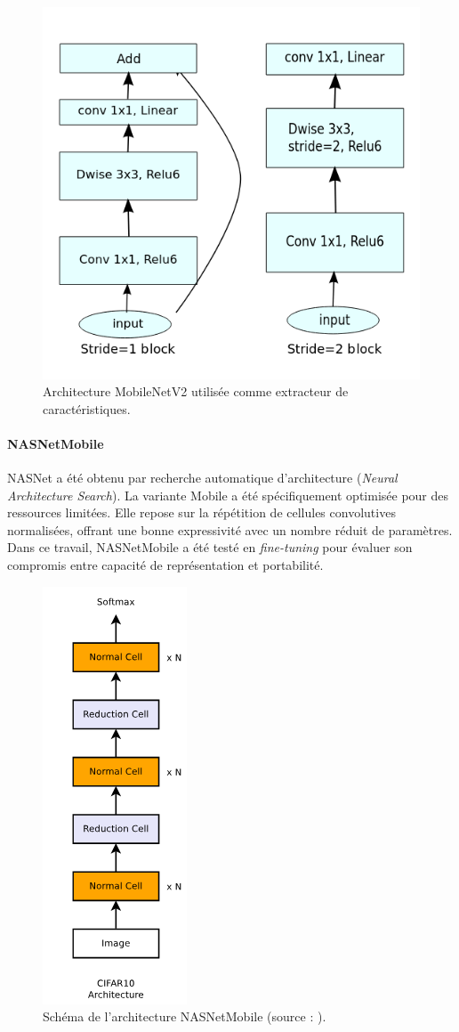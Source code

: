 \begin{figure}[H]
    \centering
    \includegraphics[width=0.65\linewidth]{figures/mobilenetv2.png}
    \caption{Architecture MobileNetV2 utilisée comme extracteur de caractéristiques.}
    \label{fig:mobilenetv2}
\end{figure}

\paragraph{NASNetMobile}
NASNet \cite{zoph2018} a été obtenu par recherche automatique d’architecture (\emph{Neural Architecture Search}).  
La variante Mobile a été spécifiquement optimisée pour des ressources limitées.  
Elle repose sur la répétition de cellules convolutives normalisées, offrant une bonne expressivité avec un nombre réduit de paramètres.  
Dans ce travail, NASNetMobile a été testé en \emph{fine-tuning} pour évaluer son compromis entre capacité de représentation et portabilité.

\begin{figure}[H]
    \centering
	\footnotesize
    \includegraphics[width=0.3\linewidth]{figures/nasnetmobile.png}
    \caption{Schéma de l’architecture NASNetMobile (source : \cite{zoph2018}).}
    \label{fig:nasnetmobile}
\end{figure}


